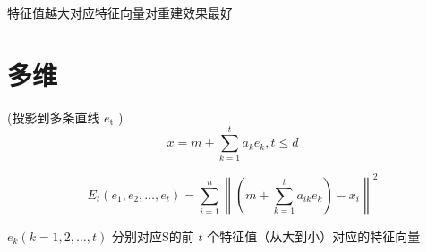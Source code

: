 特征值越大对应特征向量对重建效果最好

\section{多维}

(投影到多条直线 $ e_{\mathrm{t}} $ )
\begin{equation}
x=m+\sum_{k=1}^{t} a_{k} e_{k}, t \leq d
\end{equation}

\begin{equation} E_{t}\left(e_{1}, e_{2}, \ldots, e_{t}\right)=\sum_{i=1}^{n}\left\|\left(m+\sum_{k=1}^{t} a_{i k} e_{k}\right)-x_{i}\right\|^{2} \end{equation}

$ e_{k}(k=1,2, \ldots, t) $ 分别对应S的前 $ t $ 个特征值（从大到小）对应的特征向量